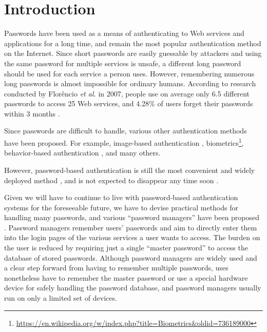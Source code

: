 \documentclass[runningheads,a4paper]{llncs}
\begin{document}
\section{Introduction}

Passwords have been used as a means of authenticating to Web services and applications
for a long time, and remain the most popular authentication method on the Internet.
%
Since short passwords are easily guessable by attackers and
using the same password for multiple services is unsafe,
a different long password should be used for each service a person uses.
However, remembering numerous long passwords is almost impossible for ordinary humans.
%
According to research conducted by Flor\^{e}ncio {\it et al.\/} in 2007,
people use on average only 6.5 different passwords to access 25 Web services, and
4.28\% of users forget their passwords within 3 months \cite{Florencio:2007:LSW:1242572.1242661}.

Since passwords are difficult to handle, various other authentication methods have been proposed.
For example, image-based authentication \cite{Biddle:2012:GPL:2333112.2333114,GraphicalPasswords}, 
biometrics\footnote{
  \url{https://en.wikipedia.org/w/index.php?title=Biometrics&oldid=736189000}
},
behavior-based authentication \cite{Dandapat:2015:AYD:2702123.2702457}, and many others.


However, password-based authentication is still the most
convenient and widely deployed method \cite{Bonneau:ReplacePasswords},
and is not expected to disappear any time soon \cite{Herley:2009:PSS:1601990.1602010}.

Given we will have to continue to live with password-based authentication systems for the foreseeable future,
we have to devise practical methods for handling many passwords, and various ``password managers'' have been proposed
\cite{OnePassword,Dashlane,MilPass,LastPass,KeyPass,NortonIDSafe,IDManager}.
%
Password managers remember users' passwords and aim to directly enter them into the login pages of the various services a user wants to access.
%
The burden on the user is reduced by requiring just a single ``master password'' to access the database of stored passwords.
%
Although password managers are widely used and a clear step forward from having to remember multiple passwords, uses nonetheless have to remember the master password or use a special hardware device for safely handling the password database, and password managers usually run on only a limited set of devices.
\end{document}
